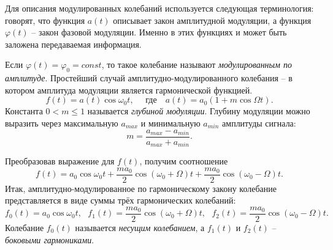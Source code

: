 \documentclass[a4paper,12pt]{article}
\begin{document}
Для описания модулированных колебаний используется следующая терминология: говорят, что функция $a(t)$ описывает закон амплитудной модуляции, а функция $\varphi (t)$ -- закон фазовой модуляции. Именно в этих функциях и может быть заложена передаваемая информация.

Если $\varphi (t) = \varphi_0 = const$, то такое колебание называют \textit{модулированным по амплитуде}. Простейший случай амплитудно-модулированного колебания -- в котором амплитуда модуляции является гармонической функцией.
\[f(t) = a(t)\cos \omega_0 t, \quad \text{ где} \quad a(t) = a_0(1 + m\cos\Omega t).\]
Константа $0 < m \leq 1$ называется \textit{глубиной модуляции}. Глубину модуляции можно выразить через максимальную $a_{max}$ и минимальную $a_{min}$ амплитуды сигнала:
\begin{equation}\label{eq: m via amax amin}
   m = \frac{a_{max} - a_{min}}{a_{max} + a_{min}}. 
\end{equation}

Преобразовав выражение для $f(t)$, получим соотношение
\[f(t) = a_0 \cos \omega_0 t + \frac{m a_0}{2} \cos(\omega_0 + \Omega) t + \frac{m a_0}{2} \cos(\omega_0 - \Omega) t.\]
Итак, амплитудно-модулированное по гармоническому закону колебание представляется в виде суммы трёх гармонических колебаний:
\[f_0(t) = a_0 \cos \omega_0 t, \text{  } f_1(t) = \frac{m a_0}{2} \cos(\omega_0 + \Omega) t, \text{  } f_2(t) = \frac{m a_0}{2} \cos(\omega_0 - \Omega) t.\]
Колебание $f_0(t)$ называется \textit{несущим колебанием}, а $f_1(t)$ и $f_2(t)$ -- \textit{боковыми гармониками}. 
\end{document}
